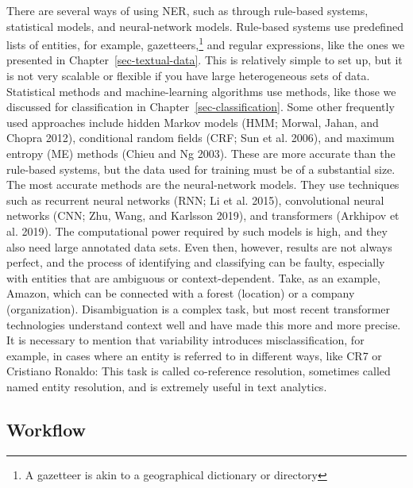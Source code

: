 There are several ways of using NER, such as through rule-based systems,
statistical models, and neural-network models. Rule-based systems use
predefined lists of entities, for example, gazetteers,\footnote{A
  gazetteer is akin to a geographical dictionary or directory} and
regular expressions, like the ones we presented in
Chapter~\ref{sec-textual-data}. This is relatively simple to set up,
but it is not very scalable or flexible if you have large heterogeneous sets of 
data. Statistical methods and machine-learning algorithms use
methods, like those we discussed for classification in
Chapter~\ref{sec-classification}. Some other frequently used approaches
include hidden Markov models (HMM; Morwal, Jahan, and Chopra 2012),
conditional random fields (CRF; Sun et al. 2006), and maximum entropy
(ME) methods (Chieu and Ng 2003). These are more accurate than
the rule-based systems, but the data used for training must be of a
substantial size. The most accurate methods are the neural-network
models. They use techniques such as recurrent neural networks (RNN; Li
et al. 2015), convolutional neural networks (CNN; Zhu, Wang, and
Karlsson 2019), and transformers (Arkhipov et al. 2019). The computational power required by such models is high, and
they also need large annotated data sets. Even then, however, results are not
always perfect, and the process of identifying and classifying can be
faulty, especially with entities that are ambiguous or
context-dependent. Take, as an example, Amazon, which can be connected with
a forest (location) or a company (organization). Disambiguation is a
complex task, but most recent transformer technologies understand
context well and have made this more and more precise. It is necessary to
mention that variability introduces misclassification, for example, in
cases where an entity is referred to in different ways, like CR7 or
Cristiano Ronaldo: This task is called co-reference resolution, sometimes
called named entity resolution, and is extremely useful in text analytics.

\subsection{Workflow}\label{workflow}

